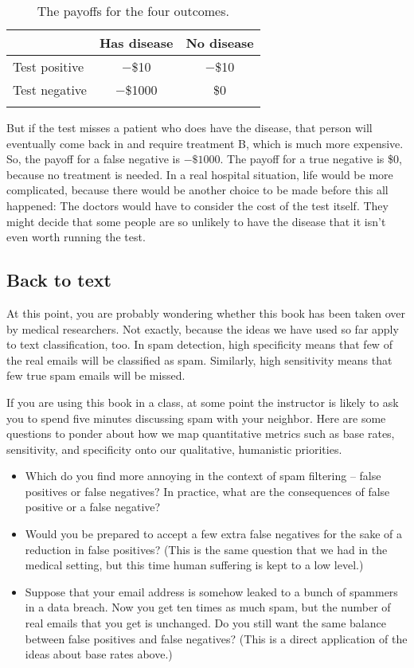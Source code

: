 \begin{table}
\begin{tabular}{lcc}
\lsptoprule
& Has disease & No disease \\ \midrule
Test positive & $-$\$10 & $-$\$10 \\
Test negative & $-$\$1000 & \$0 \\
 \lspbottomrule
\end{tabular}
\caption{The payoffs for the four outcomes.}
\label{tab:payoffs}
\end{table}

But if the test misses a patient who does have the disease, that
person will eventually come back in and require treatment B, which is
much more expensive. So, the payoff for a false negative is
$-\$1000$. The payoff for a true negative is \$0, because no treatment
is needed.
In a real hospital situation, life would be more
  complicated, because there would be another choice to be made before
  this all happened: The doctors would have to consider the cost of
  the test itself. They might decide that some people are so unlikely
  to have the disease that it isn't even worth running the test.

\subsection{Back to text}

At this point, you are probably wondering whether this book has been taken over by medical researchers. Not exactly, 
because the ideas we have used so far apply to text classification, too.
In spam
detection, high specificity means that few of the real emails
will be classified as spam.  
Similarly, high sensitivity means that few true spam emails will be
missed.

If you are
using this book in a class, at some point the instructor is likely to ask you to
spend five minutes discussing spam with your neighbor.
Here are some questions to ponder about how we map quantitative metrics such as base rates, sensitivity, and specificity onto our qualitative, humanistic priorities.

\begin{itemize}
\item Which do you find more annoying in the context of spam 
  filtering -- false positives or false negatives? In practice, what are the consequences of  false positive or a false negative?
\item Would you be prepared to accept a few extra false negatives for
the sake of a reduction in false positives? (This is the same question that we had in the medical setting, but this time human suffering is kept to a low level.)
\item Suppose that your email address is somehow leaked to a bunch of spammers in a data breach. Now you get ten times as much spam, but the number of
  real emails that you get is unchanged. Do you still want the same
  balance between false positives and false negatives? (This is a direct application of the ideas about base rates above.)
\end{itemize}


